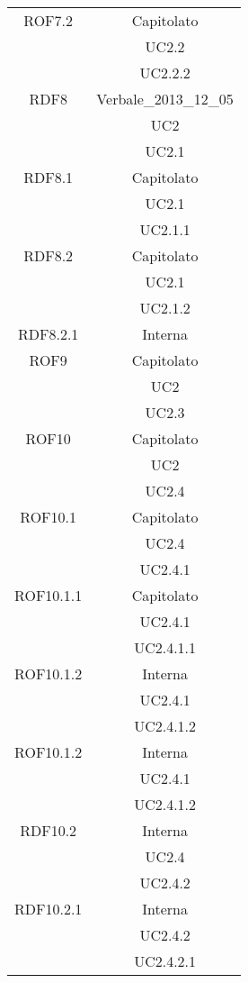 \begin{longtable}{|c|c|}
\midrule
ROF7.2
& Capitolato\\
& UC2.2\\
& UC2.2.2\\

\midrule
RDF8
& Verbale\_2013\_12\_05\\
& UC2\\
& UC2.1\\

\midrule
RDF8.1
& Capitolato\\
& UC2.1\\
& UC2.1.1\\

\midrule
RDF8.2
& Capitolato\\
& UC2.1\\
& UC2.1.2\\

\midrule
RDF8.2.1
& Interna\\

\midrule
ROF9
& Capitolato\\
& UC2\\
& UC2.3\\

\midrule
ROF10
& Capitolato\\
& UC2\\
& UC2.4\\

\midrule
ROF10.1
& Capitolato\\
& UC2.4\\
& UC2.4.1\\

\midrule
ROF10.1.1
& Capitolato\\
& UC2.4.1\\
& UC2.4.1.1\\

\midrule
ROF10.1.2
& Interna\\
& UC2.4.1\\
& UC2.4.1.2\\

\midrule
ROF10.1.2
& Interna\\
& UC2.4.1\\
& UC2.4.1.2\\

\midrule
RDF10.2
& Interna\\
& UC2.4\\
& UC2.4.2\\

\midrule
RDF10.2.1
& Interna\\
& UC2.4.2\\
& UC2.4.2.1\\


\end{longtable}
